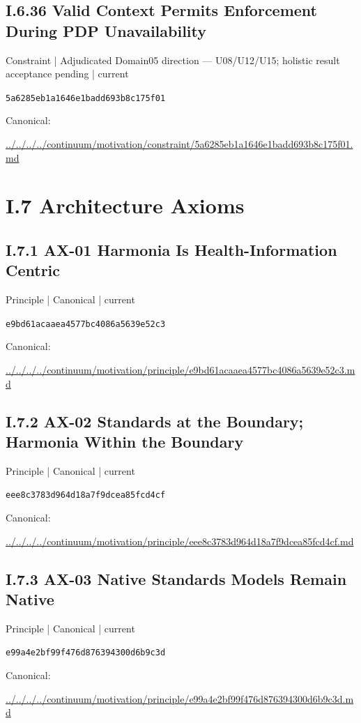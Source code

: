 \documentclass[10pt,a4paper]{article}
\begin{document}
\subsection*{I.6.36 Valid Context Permits Enforcement During PDP Unavailability}
{\small Constraint | Adjudicated Domain05 direction — U08/U12/U15; holistic result acceptance pending | current}\par
\texttt{5a6285eb1a1646e1badd693b8c175f01}\par
Canonical: \par
{\footnotesize\url{../../../../continuum/motivation/constraint/5a6285eb1a1646e1badd693b8c175f01.md}}\par
\section*{I.7 Architecture Axioms}
\subsection*{I.7.1 AX-01 Harmonia Is Health-Information Centric}
{\small Principle | Canonical | current}\par
\texttt{e9bd61acaaea4577bc4086a5639e52c3}\par
Canonical: \par
{\footnotesize\url{../../../../continuum/motivation/principle/e9bd61acaaea4577bc4086a5639e52c3.md}}\par
\subsection*{I.7.2 AX-02 Standards at the Boundary; Harmonia Within the Boundary}
{\small Principle | Canonical | current}\par
\texttt{eee8c3783d964d18a7f9dcea85fcd4cf}\par
Canonical: \par
{\footnotesize\url{../../../../continuum/motivation/principle/eee8c3783d964d18a7f9dcea85fcd4cf.md}}\par
\subsection*{I.7.3 AX-03 Native Standards Models Remain Native}
{\small Principle | Canonical | current}\par
\texttt{e99a4e2bf99f476d876394300d6b9c3d}\par
Canonical: \par
{\footnotesize\url{../../../../continuum/motivation/principle/e99a4e2bf99f476d876394300d6b9c3d.md}}\par
\end{document}
